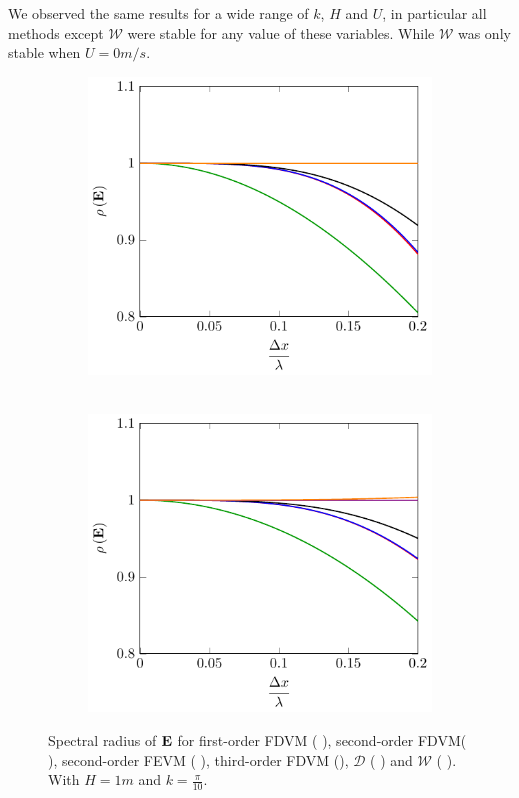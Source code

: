 We observed the same results for a wide range of $k$, $H$ and $U$, in particular all methods except $\mathcal{W}$ were stable for any value of these variables. While $\mathcal{W}$ was only stable when $U = 0m/s$.

\begin{figure}
	\centering
	\begin{subfigure}{0.5\textwidth}
		\includegraphics[width=\textwidth]{./chp4/figures/Stabu0khShallz.pdf}\
	\end{subfigure}%
	\begin{subfigure}{0.5\textwidth}
		\includegraphics[width=\textwidth]{./chp4/figures/Stabu1khShallz.pdf}
		\subcaption{$U=1$}
	\end{subfigure}
	\caption{Spectral radius of $\mathbf{E}$ for first-order FDVM ({\color{green!60!black} \solidrule}), second-order FDVM({\color{red} \solidrule}), second-order FEVM ({\color{blue} \solidrule}), third-order FDVM ({\solidrule}), $\mathcal{D}$ ({\color{violet!80!white} \solidrule}) and $\mathcal{W}$ ({\color{orange} \solidrule}). With $H = 1m$ and $k = \frac{\pi}{10}$.}
	\label{fig:StabShall}
\end{figure}
